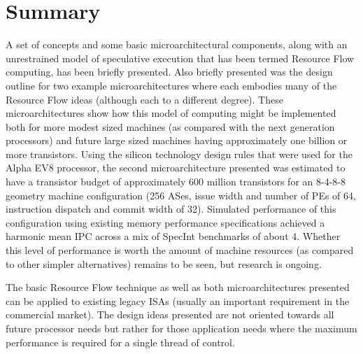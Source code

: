 \documentclass{book}
\begin{document}
\section{Summary}
%
A set of concepts and some basic microarchitectural 
components, along with an unrestrained model of speculative
execution
that has been termed Resource Flow computing, has been briefly presented.
Also briefly presented was the design outline for two 
example microarchitectures where each embodies many of 
the Resource Flow ideas (although each to a different
degree).  These microarchitectures show how this model of 
computing might be implemented
both for more modest sized machines (as compared with the next
generation processors) and future large sized machines having
approximately one billion or more transistors.
Using the silicon technology design rules that were used for
the Alpha EV8 processor, the second microarchitecture
presented was estimated to have a transistor budget of approximately
600 million transistors for an 8-4-8-8 geometry machine configuration
(256 ASes, issue width and number of PEs of 64, instruction dispatch 
and commit width of 32).  Simulated performance of this configuration
using existing memory performance specifications
achieved a harmonic mean IPC across a mix of SpecInt benchmarks
of about 4.  Whether this level of performance is worth the
amount of machine resources (as compared to other
simpler alternatives) remains to be seen, but research is ongoing.

The basic Resource Flow technique as well as both microarchitectures
presented can be applied to existing legacy ISAs (usually an
important requirement in the commercial market).
The design ideas presented are not oriented towards all
future processor needs but rather for those application
needs where the maximum performance is required for a single
thread of control.
%
%
%


%
\end{document}
